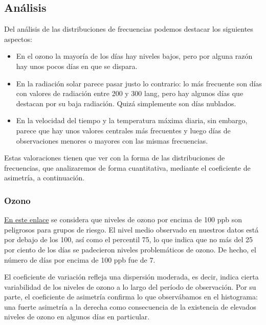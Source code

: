 \documentclass[
]{article}
\providecommand{\tightlist}{%
  \setlength{\itemsep}{0pt}\setlength{\parskip}{0pt}}
\begin{document}
\hypertarget{anuxe1lisis}{%
\subsection{Análisis}\label{anuxe1lisis}}

Del análisis de las distribuciones de frecuencias podemos destacar los
siguientes aspectos:

\begin{itemize}
\tightlist
\item
  En el ozono la mayoría de los días hay niveles bajos, pero por alguna
  razón hay unos pocos días en que se dispara.
\item
  En la radiación solar parece pasar justo lo contrario: lo más
  frecuente son días con valores de radiación entre 200 y 300 lang, pero
  hay algunos días que destacan por su baja radiación. Quizá simplemente
  son días nublados.
\item
  En la velocidad del tiempo y la temperatura máxima diaria, sin
  embargo, parece que hay unos valores centrales más frecuentes y luego
  días de observaciones menores o mayores con las mismas frecuencias.
\end{itemize}

Estas valoraciones tienen que ver con la forma de las distribuciones de
frecuencias, que analizaremos de forma cuantitativa, mediante el
coeficiente de asimetría, a continuación.

\hypertarget{ozono}{%
\subsubsection{Ozono}\label{ozono}}

\href{https://airnow.gov/index.cfm?action=pubs.aqiguideozone}{En este
enlace} se considera que niveles de ozono por encima de 100 ppb son
peligrosos para grupos de riesgo. El nivel medio observado en nuestros
datos está por debajo de los 100, así como el percentil 75, lo que
indica que no más del 25 por ciento de los días se padecieron niveles
problemáticos de ozono. De hecho, el número de días por encima de 100
ppb fue de 7.

El coeficiente de variación refleja una dispersión moderada, es decir,
indica cierta variabilidad de los niveles de ozono a lo largo del
período de observación. Por su parte, el coeficiente de asimetría
confirma lo que observábamos en el histograma: una fuerte asimetría a la
derecha como consecuencia de la existencia de elevados niveles de ozono
en algunos días en particular.
\end{document}
